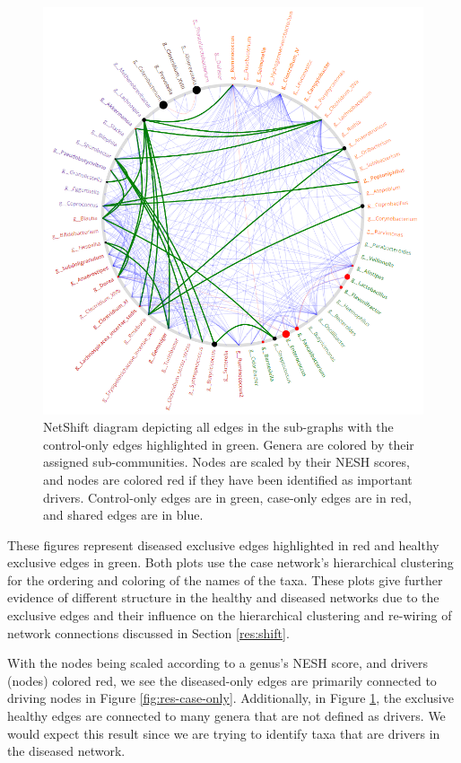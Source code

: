 \begin{figure}[htb!]
    \centering
    \includegraphics[width=1.0\linewidth]{figure/results/control_only.png}
    \caption[NetShift diagram depicting all edges in the sub-graphs with the control-only edges highlighted in green.]{NetShift diagram depicting all edges in the sub-graphs with the control-only edges highlighted in green. Genera are colored by their assigned sub-communities. Nodes are scaled by their \acrshort{NESH} scores, and nodes are colored red if they have been identified as important drivers. Control-only edges are in green, case-only edges are in red, and shared edges are in blue.}
    \label{fig:res-control-only}
\end{figure}
These figures represent diseased exclusive edges highlighted in red and healthy exclusive edges in green. Both plots use the case network's hierarchical clustering for the ordering and coloring of the names of the taxa. These plots give further evidence of different structure in the healthy and diseased networks due to the exclusive edges and their influence on the hierarchical clustering and re-wiring of network connections discussed in Section \ref{res:shift}. 

With the nodes being scaled according to a genus's \acrshort{NESH} score, and drivers (nodes) colored red, we see the diseased-only edges are primarily connected to driving nodes in Figure \ref{fig:res-case-only}. Additionally, in Figure \ref{fig:res-control-only}, the exclusive healthy edges are connected to many genera that are not defined as drivers. We would expect this result since we are trying to identify taxa that are drivers in the diseased network. 

